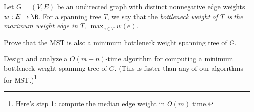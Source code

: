 \documentclass{article}
\begin{document}
 Let \( G=(V,E) \) be an undirected graph with distinct nonnegative edge weights \( w:E\to\R \).
For a spanning tree \( T \), we say that the \it{bottleneck weight of \( T \)} is the maximum weight edge in \( T \), \( \max_{e\in T} w(e) \).
\setcounter{section}{16}
\setcounter{exercise}{6}
\begin{subexercise}
Prove that the MST is also a minimum bottleneck weight spanning tree of \( G \).
\end{subexercise}

\begin{solution}

\end{solution}
\pagebreak

\begin{subexercise}
  Design and analyze a \( O(m + n) \)-time algorithm for computing a minimum
bottleneck weight spanning tree of \( G \).
(This is faster than any of our algorithms for MST.)\footnote[4]{Here's step 1: compute the median edge weight in \( O(m) \) time.}
\end{subexercise}

\begin{solution}

\end{solution}
\pagebreak
\end{document}
